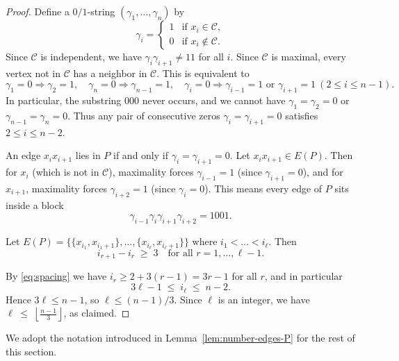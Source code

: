 \documentclass[12pt]{amsart}
\theoremstyle{plain}
\theoremstyle{definition}
\begin{document}
\begin{proof}
Define a $0/1$-string $(\gamma_1,\dots,\gamma_n)$ by
\[
\gamma_i =
\begin{cases}
1 & \text{if } x_i \in \mathcal{C},\\[2pt]
0 & \text{if } x_i \notin \mathcal{C}.
\end{cases}
\]
Since $\mathcal{C}$  is independent, we have $\gamma_i \gamma_{i+1} \neq 11$ for all $i$.  
Since $\mathcal{C}$  is maximal, every vertex not in $\mathcal{C}$  has a neighbor in $\mathcal{C}$. This is equivalent to
\[
\gamma_1 = 0 \Rightarrow \gamma_2 = 1,\quad
\gamma_n = 0 \Rightarrow \gamma_{n-1} = 1,\quad
\gamma_i = 0 \Rightarrow \gamma_{i-1}=1 \text{ or } \gamma_{i+1}=1
\ (2 \le i \le n-1).
\]
In particular, the substring $000$ never occurs, and we cannot have 
$\gamma_1=\gamma_2=0$ or $\gamma_{n-1}=\gamma_n=0$.  
Thus any pair of consecutive zeros $\gamma_i=\gamma_{i+1}=0$ satisfies $2 \le i \le n-2$.

An edge $x_i x_{i+1}$ lies in $P$ if and only if $\gamma_i=\gamma_{i+1}=0$.  
Let $x_i x_{i+1} \in E(P)$. 
Then for $x_i$ (which is not in $\mathcal{C}$), maximality forces $\gamma_{i-1}=1$ (since $\gamma_{i+1}=0$),  
and for $x_{i+1}$, maximality forces $\gamma_{i+2}=1$ (since $\gamma_i=0$).  
This means every edge of $P$ sits inside a block
\[
\gamma_{i-1}\gamma_i\gamma_{i+1}\gamma_{i+2} = 1 0 0 1.
\]

Let \(E(P)=  \{ \{x_{i_1}, x_{i_1+1}\}, \ldots, \{x_{i_{\ell}}, x_{i_{\ell}+1}\}\}\)
where $i_1<\dots<i_\ell$. Then
\begin{equation}\label{eq:spacing}
i_{r+1} - i_r \;\ge\; 3 \quad \text{for all } r = 1,\dots,\ell-1.
\end{equation}

By \eqref{eq:spacing} we have $i_r \ge 2 + 3(r-1) = 3r-1$ for all $r$, and in particular
\[
3\ell - 1 \;\le\; i_\ell \;\le\; n-2.
\]
Hence $3\ell \le n-1$, so $\ell \le (n-1)/3$. Since $\ell$ is an integer, we have
\(\ell \;\le\; \left\lfloor \frac{n-1}{3} \right\rfloor\), as claimed.
\end{proof}

We adopt the notation introduced in Lemma~\ref{lem:number-edges-P} for the rest of this section.
\end{document}
